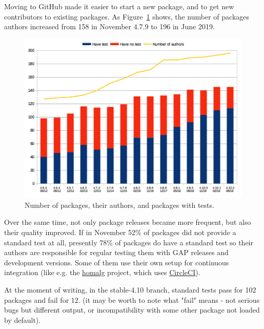 \documentclass{deliverablereport}
\begin{document}
Moving to GitHub made it easier to start a new package, and to 
get new contributors to existing packages. As Figure~\ref{fig:gap-package-tests}
shows, the number of packages authors increased from 158 in
November 4.7.9 to 196 in June 2019. 

\begin{figure}[!ht]
    \centering
    \includegraphics[width=\textwidth]{images/gap-package-tests}
    \caption{Number of \GAP packages, their authors, and packages with tests.}
    \label{fig:gap-package-tests}
\end{figure}

Over the same time, not only package releases became more frequent, but also their quality
improved. If in November 52\% of packages did not provide a standard 
test at all, presently 78\% of packages do have a standard test 
so their authors are responsible for regular testing them 
with GAP releases and development versions.
Some of them use their own setup for continuous integration
(like e.g. the \href{https://homalg-project.github.io/}{\sf homalg} project,
which uses \href{https://circleci.com/}{CircleCI}).

At the moment of writing, in the stable-4.10 branch,
standard tests pass for 102 packages
and fail for 12.
(it may be worth to note what "fail" means - not serious bugs
but different output, or incompatibility with some other package
not loaded by default).
\end{document}

